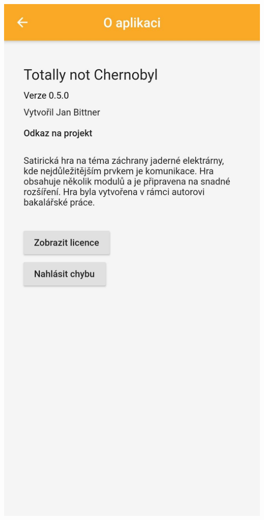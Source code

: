\documentclass[czech,aspectratio=169]{beamer}
\begin{document}
\begin{frame}
\begin{columns}
\begin{column}{.25\textwidth}
\begin{center}
          \includegraphics[width=.9\textwidth]{assets/slides/screen-a3}
        \end{center}
      \end{column}
    \end{columns}
  \end{frame}
\end{document}
